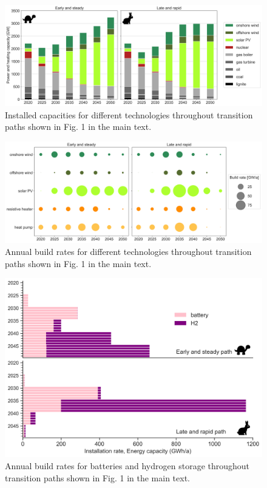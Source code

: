 \documentclass[3p]{elsarticle} %
\begin{document}
\begin{figure}[!h]
	\centering
	\includegraphics[width=\columnwidth]{../figures/installed_capacity_Base.png}
	\caption{Installed capacities for different technologies throughout transition paths shown in Fig. 1 in the main text.} \label{fig_installed_capacity} 
\end{figure}
\clearpage

\begin{figure}[!h]
\centering
\includegraphics[width=\columnwidth]{../figures/build_rates_Base.png}
\caption{Annual build rates for different technologies throughout transition paths shown in Fig. 1 in the main text. } \label{fig_build_rates} 
\end{figure}
\clearpage

\begin{figure}[!h]
\centering
\includegraphics[width=0.7\columnwidth]{../figures/storage_expansion_Base.png}
\caption{Annual build rates for batteries and hydrogen storage throughout transition paths shown in Fig. 1 in the main text.} \label{fig_battery_hydrogen} 
\end{figure}
\clearpage
\end{document}

